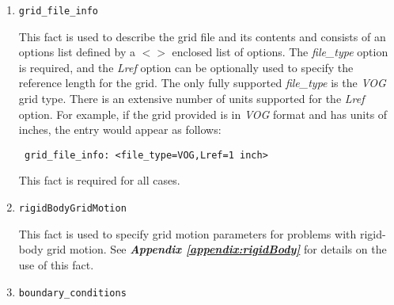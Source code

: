 \documentclass{article}
\begin{document}
\begin{enumerate}

\item{\tt grid\_file\_info}

This fact is used to describe the grid file and its contents and consists of
an options list defined by a $< >$ enclosed list of options. The
\emph{file\_type} option is required, and the \emph{Lref} option can be
optionally used to specify the reference length for the grid. The only fully
supported \emph{file\_type} is the \emph{VOG} grid type. There is an extensive
number of units supported for the \emph{Lref} option. For example, if the grid
provided is in \emph{VOG} format and has units of inches, the entry would
appear as follows:
  \begin{verbatim} grid_file_info: <file_type=VOG,Lref=1 inch> \end{verbatim}
This fact is required for all cases.

\item{\tt rigidBodyGridMotion}

This fact is used to specify grid motion parameters for problems with rigid-
body grid motion. See \emph{\bf Appendix \ref{appendix:rigidBody}} for details
on the use of this fact.

\item{\tt boundary\_conditions}


\end{enumerate}
\end{document}
